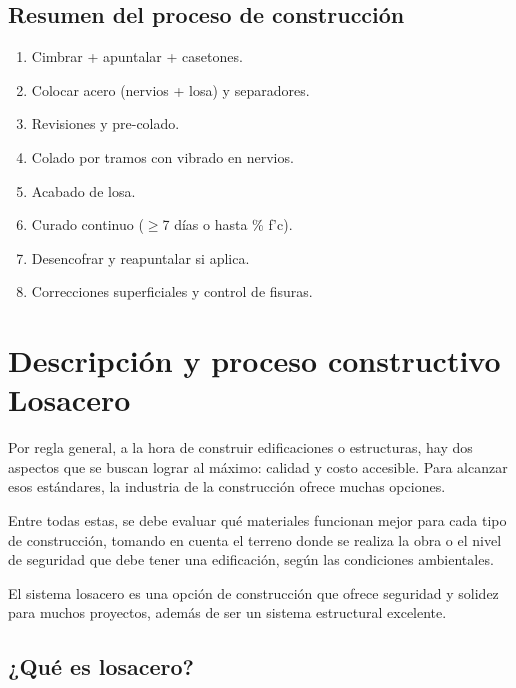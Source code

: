 \documentclass[12pt]{article}
\begin{document}
	\subsection{Resumen del proceso de construcción}
	\begin{enumerate}
		\item Cimbrar + apuntalar + casetones.
		\item Colocar acero (nervios + losa) y separadores.
		\item Revisiones y pre-colado.
		\item Colado por tramos con vibrado en nervios.
		\item Acabado de losa.
		\item Curado continuo ($\geq$7 días o hasta \% f’c).
		\item Desencofrar y reapuntalar si aplica.
		\item Correcciones superficiales y control de fisuras.
	\end{enumerate}
	
	
	
	

	
		
	
	

	
	\section{Descripción y proceso constructivo Losacero}

	Por regla general, a la hora de construir edificaciones o estructuras, hay dos aspectos que se buscan lograr al máximo: calidad y costo accesible. Para alcanzar esos estándares, la industria de la construcción ofrece muchas opciones.
		
	Entre todas estas, se debe evaluar qué materiales funcionan mejor para cada tipo de construcción, tomando en cuenta el terreno donde se realiza la obra o el nivel de seguridad que debe tener una edificación, según las condiciones ambientales.
	
	
	El sistema losacero es una opción de construcción que ofrece seguridad y solidez para muchos proyectos, además de ser un sistema estructural excelente.
	
	
	\subsection{¿Qué es losacero?}
	
\end{document}
